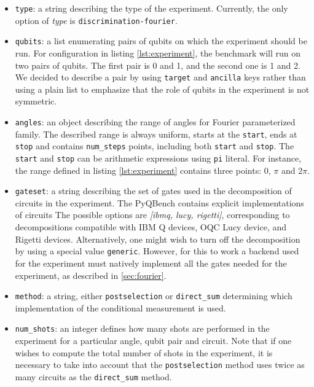 \documentclass[preprint,12pt, a4paper, dvipsnames]{elsarticle}
\newcommand{\1}{{\rm 1\hspace{-0.9mm}l}}
\theoremstyle{definition}
\begin{document}
\begin{itemize}
	\item \texttt{type}: a string describing the type of the experiment. Currently, the only option of  \textit{type} is \texttt{discrimination-fourier}.
	\item \texttt{qubits}: a list enumerating pairs of qubits on which the experiment should be run.
	For configuration in listing \ref{lst:experiment}, the benchmark will run on two pairs of qubits. The first pair is 0 and 1, and
	the second one is 1 and 2. We decided to describe a pair by using \texttt{target} and
	\texttt{ancilla} keys rather than using a plain list to emphasize that the role of qubits in the
	experiment is not symmetric.
	\item \texttt{angles}: an object describing the range of angles for Fourier parameterized
	family. The described range is always uniform, starts at the \texttt{start}, ends at
	\texttt{stop} and contains \texttt{num\_steps} points, including both \texttt{start} and
	\texttt{stop}. The \texttt{start} and \texttt{stop} can be arithmetic expressions using
	\texttt{pi} literal. For instance, the range defined in listing \ref{lst:experiment} contains
	three points: 0, $\pi$ and $2\pi$.
 	 \item \texttt{gateset}: a string describing the set of gates used in the decomposition of
 	 circuits in the experiment. The PyQBench contains explicit implementations of circuits The
 	 possible options are \textit{[ibmq, lucy, rigetti]}, corresponding to decompositions
 	 compatible with IBM Q devices, OQC Lucy device, and Rigetti devices. Alternatively, one might
 	 wish to turn off the decomposition by using a special value \texttt{generic}. However, for this
 	 to work a backend used for the experiment must natively implement all the gates needed for the
 	 experiment, as described in \ref{sec:fourier}.
 	\item \texttt{method}: a string, either \texttt{postselection} or \texttt{direct\_sum}
 	determining which implementation of the conditional measurement is used.
 	\item \texttt{num\_shots}: an integer defines how many shots are performed in the experiment for
 	a particular angle, qubit pair and circuit. Note that if one wishes to compute the total number
 	of shots in the experiment, it is necessary to take into account that the \texttt{postselection}
 	method uses twice as many circuits as the \texttt{direct\_sum} method.
\end{itemize}
\end{document}
